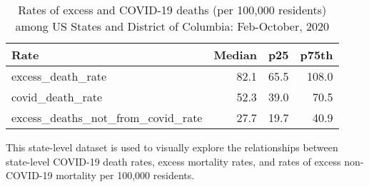 \documentclass[
]{article}
\begin{document}
\begin{table}

\caption{\label{tab:unnamed-chunk-6}Rates of excess and COVID-19 deaths (per 100,000 residents) among US States and District of Columbia: Feb-October, 2020}
\centering
\begin{tabular}[t]{l|r|r|r}
\hline
Rate & Median & p25 & p75th\\
\hline
excess\_death\_rate & 82.1 & 65.5 & 108.0\\
\hline
covid\_death\_rate & 52.3 & 39.0 & 70.5\\
\hline
excess\_deaths\_not\_from\_covid\_rate & 27.7 & 19.7 & 40.9\\
\hline
\end{tabular}
\end{table}

This state-level dataset is used to visually explore the relationships
between state-level COVID-19 death rates, excess mortality rates, and
rates of excess non-COVID-19 mortality per 100,000 residents.
\end{document}
